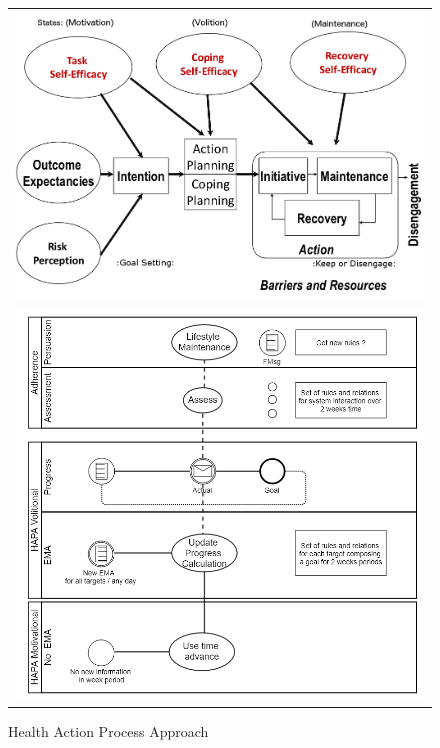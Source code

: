 \documentclass[graybox]{svmult}
\begin{document}
\begin{figure}
  \begin{center}
  \begin{tabular}{c}
    \includegraphics[scale=0.4]{hapa_firem.png}\\
    \includegraphics[scale=0.4]{Hapa.png}\\
    \end{tabular}
    \caption{Health Action Process Approach \cite{rem2012}}
     \label{Fig.hapa}
\end{center}
\end{figure} 
\end{document}
